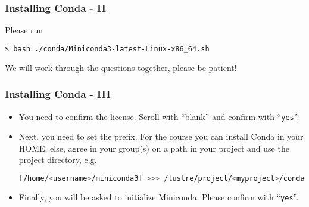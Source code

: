 \begin{frame}[fragile]
  \frametitle{Installing Conda - II}
  Please run
  \begin{lstlisting}[language=Bash, style=Shell]
$ bash ./conda/Miniconda3-latest-Linux-x86_64.sh
  \end{lstlisting}
  We will work through the questions together, please be patient!
\end{frame}

\begin{frame}[fragile]
  \frametitle{Installing Conda - III}
  \begin{itemize}[<+->]
   \item You need to confirm the license. Scroll with ``blank'' and confirm with ``\verb+yes+''.
   \item Next, you need to set the prefix. For the course you can install Conda in your HOME, else, agree in your group(s) on a path in your project and use the project directory, e.g. 
   \begin{lstlisting}[language=Bash, style=Shell, breaklines=true ]
[/home/<username>/miniconda3] >>> /lustre/project/<myproject>/conda
   \end{lstlisting}
   \item Finally, you will be asked to initialize Miniconda. Please confirm with ``\verb+yes+''.
  \end{itemize}
\end{frame}

